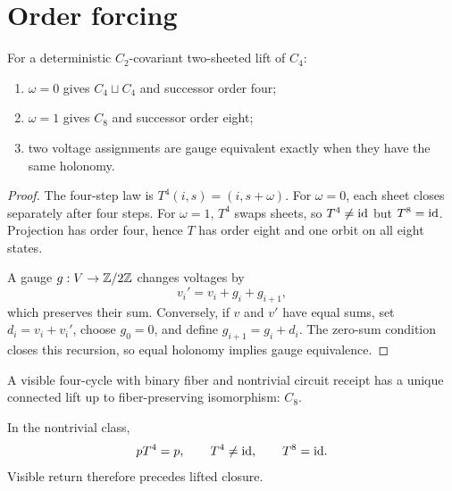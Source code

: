 \section{Order forcing}

\begin{theorem}
For a deterministic \(C_2\)-covariant two-sheeted lift of \(C_4\):
\begin{enumerate}
\item \(\omega=0\) gives \(C_4\sqcup C_4\) and successor order
four;
\item \(\omega=1\) gives \(C_8\) and successor order eight;
\item two voltage assignments are gauge equivalent exactly when they
have the same holonomy.
\end{enumerate}
\end{theorem}

\begin{proof}
The four-step law is \(T^4(i,s)=(i,s+\omega)\).
For \(\omega=0\), each sheet closes separately after four steps.
For \(\omega=1\), \(T^4\) swaps sheets, so \(T^4\neq\mathrm{id}\) but
\(T^8=\mathrm{id}\). Projection has order four, hence \(T\) has order
eight and one orbit on all eight states.

A gauge \(g:V\to\mathbb{Z}/2\mathbb{Z}\) changes voltages by
\[
v_i'=v_i+g_i+g_{i+1},
\]
which preserves their sum. Conversely, if \(v\) and \(v'\) have
equal sums, set \(d_i=v_i+v_i'\), choose \(g_0=0\), and define
\(g_{i+1}=g_i+d_i\). The zero-sum condition closes this recursion,
so equal holonomy implies gauge equivalence.
\end{proof}

\begin{corollary}
A visible four-cycle with binary fiber and nontrivial circuit receipt
has a unique connected lift up to fiber-preserving isomorphism:
\(C_8\).
\end{corollary}

In the nontrivial class,
\[
pT^4=p,\qquad T^4\neq\mathrm{id},\qquad T^8=\mathrm{id}.
\]
Visible return therefore precedes lifted closure.
